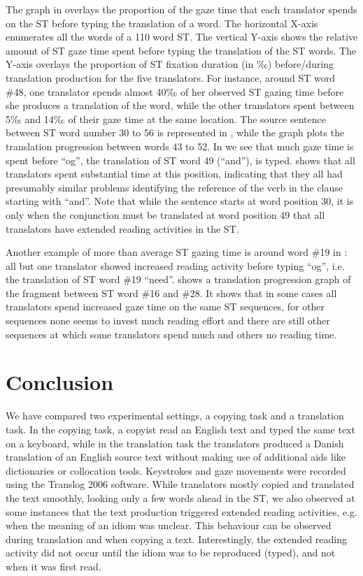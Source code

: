 \documentclass[output=paper]{LSP/langsci}
\begin{document}
The graph in  overlays the proportion of the gaze time that each translator spends on the ST before typing the translation of a word. The horizontal X{}-axis enumerates all the words of a 110 word ST. The vertical Y{}-axis shows the relative amount of ST gaze time spent before typing the translation of the ST words. The Y{}-axis overlays the proportion of ST fixation duration (in ‰) before/during translation production for the five translators. For instance, around ST word \#48, one translator spends almost 40‰ of her observed ST gazing time before she produces a translation of the word, while the other translators spent between 5‰ and 14‰ of their gaze time at the same location. The source sentence between ST word number 30 to 56 is represented in , while the graph plots the translation progression between words 43 to 52. In  we see that much gaze time is spent before ``og'', the translation of ST word 49 (``and''), is typed.  shows that all translators spent substantial time at this position, indicating that they all had presumably similar problems identifying the reference of the verb in the clause starting with ``and''. Note that while the sentence starts at word position 30, it is only when the conjunction must be translated at word position 49 that all translators have extended reading activities in the ST.

Another example of more than average ST gazing time is around word \#19 in : all but one translator showed increased reading activity before typing ``og'', i.e. the translation of ST word \#19 ``need''.  shows a translation progression graph of the fragment between ST word \#16 and \#28. It shows that in some cases all translators spend increased gaze time on the same ST sequences, for other sequences none seems to invest much reading effort and there are still other sequences at which some translators spend much and others no reading time. 

\section{Conclusion}\label{sec:carl:6}

We have compared two experimental settings, a copying task and a translation task. In the copying task, a copyist read an English text and typed the same text on a keyboard, while in the translation task the translators produced a Danish translation of an English source text without making use of additional aids like dictionaries or collocation tools. Keystrokes and gaze movements were recorded using the Translog 2006 software. While translators mostly copied and translated the text smoothly, looking only a few words ahead in the ST, we also observed at some instances that the text production triggered extended reading activities, e.g. when the meaning of an idiom was unclear. This behaviour can be observed during translation and when copying a text. Interestingly, the extended reading activity did not occur until the idiom was to be reproduced (typed), and not when it was first read.
\end{document}
